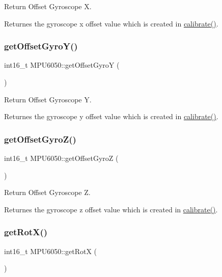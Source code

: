 Return Offset Gyroscope X. 

Returnes the gyroscope x offset value which is created in \mbox{\hyperlink{class_m_p_u6050_a35657154dd30e206e09ea6407ede106c}{calibrate()}}. \mbox{\label{class_m_p_u6050_a0920360c16a673f8803c9eafebda02ff}} 
\subsubsection{\texorpdfstring{get\+Offset\+Gyro\+Y()}{getOffsetGyroY()}}
{\footnotesize\ttfamily int16\+\_\+t M\+P\+U6050\+::get\+Offset\+GyroY (\begin{DoxyParamCaption}{ }\end{DoxyParamCaption})}



Return Offset Gyroscope Y. 

Returnes the gyroscope y offset value which is created in \mbox{\hyperlink{class_m_p_u6050_a35657154dd30e206e09ea6407ede106c}{calibrate()}}. \mbox{\label{class_m_p_u6050_af55bc5b021562e2b6feee7be362901ac}} 
\subsubsection{\texorpdfstring{get\+Offset\+Gyro\+Z()}{getOffsetGyroZ()}}
{\footnotesize\ttfamily int16\+\_\+t M\+P\+U6050\+::get\+Offset\+GyroZ (\begin{DoxyParamCaption}{ }\end{DoxyParamCaption})}



Return Offset Gyroscope Z. 

Returnes the gyroscope z offset value which is created in \mbox{\hyperlink{class_m_p_u6050_a35657154dd30e206e09ea6407ede106c}{calibrate()}}. \mbox{\label{class_m_p_u6050_acf1eaa804de62955ddd1c629e5b7183b}} 
\subsubsection{\texorpdfstring{get\+Rot\+X()}{getRotX()}}
{\footnotesize\ttfamily int16\+\_\+t M\+P\+U6050\+::get\+RotX (\begin{DoxyParamCaption}{ }\end{DoxyParamCaption})}



